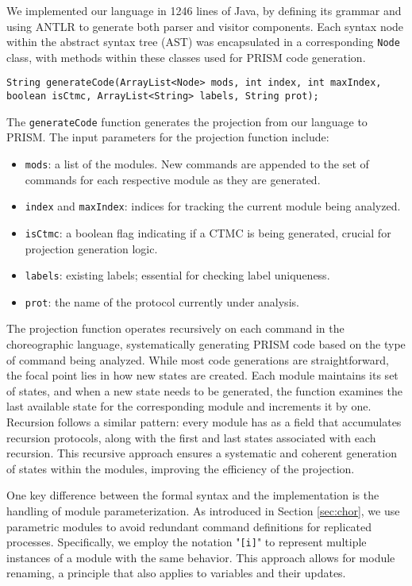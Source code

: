 We implemented our language in 1246 lines of Java, by defining its
grammar and using ANTLR \cite{ANTLR} to generate both parser and
visitor components. Each syntax node within the abstract syntax tree
(AST) was encapsulated in a corresponding {\tt Node} class, with
methods within these classes used for PRISM code generation.
\begin{lstlisting}[language=Eclipse,caption=The \texttt{generateCode} function,label=genfun1,numbers=none]
	String generateCode(ArrayList<Node> mods, int index, int maxIndex, boolean isCtmc, ArrayList<String> labels, String prot);	
\end{lstlisting}
The {\tt generateCode} function generates the projection from our language to PRISM.
The input parameters for the projection function include:
\begin{itemize}
\item \texttt{mods}: a list of the modules.  New commands are appended to the set of commands for each respective module as they are generated.
\item \texttt{index} and \texttt{maxIndex}: indices for tracking the current module being analyzed.
\item \texttt{isCtmc}: a boolean flag indicating if a CTMC is being generated, crucial for projection generation logic.
\item \texttt{labels}: existing labels; essential for checking label uniqueness.
\item \texttt{prot}: the name of the protocol currently under analysis.
\end{itemize}
The projection function operates recursively on each command in the
choreographic language, systematically generating PRISM code based on
the type of command being analyzed. While most code generations are
straightforward, the focal point lies in how new states are
created. Each module maintains its set of states, and when a new state
needs to be generated, the function examines the last available state
for the corresponding module and increments it by one.  Recursion
follows a similar pattern: every module has as a field %
that accumulates recursion protocols, along with the first and last
states associated with each recursion. This recursive approach ensures
a systematic and coherent generation of states within the modules,
improving the efficiency of the projection.

One key difference between the formal syntax and the implementation is the handling of module parameterization. As introduced in Section \ref{sec:chor}, we use parametric modules to avoid redundant command definitions for replicated processes. Specifically, we employ the notation "\texttt{[i]}" to represent multiple instances of a module with the same behavior. This approach allows for module renaming, a principle that also applies to variables and their updates.  

